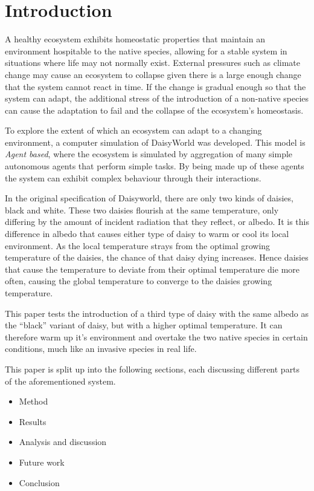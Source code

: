 \documentclass[12pt]{article}
\begin{document}
\section{Introduction}
A healthy ecosystem exhibits homeostatic properties\cite{morgan2001}
that maintain an environment hospitable to the native species,
allowing for a stable system in situations where life may not normally
exist. External pressures such as climate change may cause an
ecosystem to collapse given there is a large enough change that the
system cannot react in time\cite{barry2014}. If the change is gradual
 enough so that the system can adapt, the additional stress of the
introduction of a non-native species can cause the adaptation to fail
and the collapse of the ecosystem's homeostasis\cite{rapport1985}.

To explore the extent of which an ecosystem can adapt to a changing
environment, a computer simulation of DaisyWorld\cite{watson1983} was
developed. This model is \emph{Agent based}\cite{gilbert2007}, where
the ecosystem is simulated by aggregation of many simple autonomous
agents that perform simple tasks. By being made up of these agents the
system can exhibit complex behaviour through their interactions.

In the original specification of Daisyworld, there are only
two kinds of daisies, black and white. These two daisies flourish at
the same temperature, only differing by the amount of incident
radiation that they reflect, or albedo. It is this difference in albedo that
causes either type of daisy to warm or cool its local environment. As
the local temperature strays from the optimal growing temperature of the
daisies, the chance of that daisy dying increases. Hence daisies that
cause the temperature to deviate from their optimal temperature die more
often, causing the global temperature to converge to the daisies
growing temperature.

This paper tests the introduction of a third type of daisy with the
same albedo as the ``black'' variant of daisy, but with a higher
optimal temperature. It can therefore warm up it's environment and
overtake the two native species in certain conditions, much like an
invasive species in real life.

This paper is split up into the following sections, each discussing
different parts of the aforementioned system.

\begin{itemize}
\item Method
\item Results
\item Analysis and discussion
\item Future work
\item Conclusion
\end{itemize}
\end{document}
